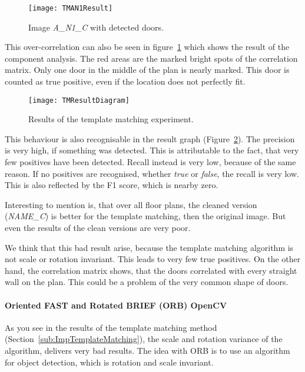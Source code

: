 \begin{figure}[H]
	\centering
	\texttt{[image: TMAN1Result]}
	\caption{Image \textit{A\_N1\_C} with detected doors.}
	\label{fig:TMAN1Result}
\end{figure}

This over-correlation can also be seen in figure~\ref{fig:TMAN1Result} which shows the result of the component analysis. The red areas are the marked bright spots of the correlation matrix. Only one door in the middle of the plan is nearly marked. This door is counted as true positive, even if the location does not perfectly fit.

\begin{figure}[H]
	\centering
	\texttt{[image: TMResultDiagram]}
	\caption{Results of the template matching experiment.}
	\label{fig:TMResultDiagram}
\end{figure}

This behaviour is also recognisable in the result graph (Figure~\ref{fig:TMResultDiagram}). The precision is very high, if something was detected. This is attributable to the fact, that very few positives have been detected. Recall instead is very low, because of the same reason. If no positives are recognised, whether \textit{true} or \textit{false}, the recall is very low. This is also reflected by the F1 score, which is nearby zero.

Interesting to mention is, that over all floor plans, the cleaned version (\textit{NAME\_C}) is better for the template matching, then the original image. But even the results of the clean versions are very poor.

We think that this bad result arise, because the template matching algorithm is not scale or rotation invariant. This leads to very few true positives. On the other hand, the correlation matrix shows, that the doors correlated with every straight wall on the plan. This could be a problem of the very common shape of doors.

\paragraph{Oriented FAST and Rotated BRIEF (ORB) OpenCV}
\label{sub:ImpORB}

As you see in the results of the template matching method (Section~\ref{sub:ImpTemplateMatching}), the scale and rotation variance of the algorithm, delivers very bad results. The idea with ORB is to use an algorithm for object detection, which is rotation and scale invariant.

